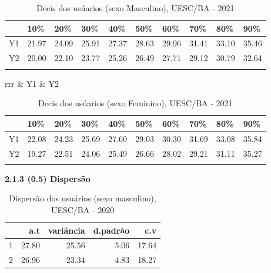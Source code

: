 \documentclass[12pt]{article}\usepackage[]{graphicx}\usepackage[]{color}
\begin{document}
\begin{table}[!ht]
  \centering
  \caption{Decis dos usúarios (sexo Masculino), UESC/BA - 2021}
\begin{tabular}{llllllllll}
\hline
   & 10\%  & 20\%  & 30\%  & 40\%  & 50\%  & 60\%  & 70\%  & 80\%  & 90\%  \\ \hline
Y1 & 21.97 & 24.09 & 25.91 & 27.37 & 28.63 & 29.96 & 31.41 & 33.10 & 35.46 \\
Y2 & 20.00 & 22.10 & 23.77 & 25.26 & 26.49 & 27.71 & 29.12 & 30.79 & 32.64 \\ \hline
   &       &       &       &       &       &       &       &       &      
\end{tabular}
 \end{table}

\begin{table}[!ht]
  \centering
  \caption{Decis dos usúarios (sexo Feminino), UESC/BA - 2021}
  \begin{tabular}{rrr}
  \toprule
 & Y1 & Y2 \\ 
  \midrule
\begin{tabular}{llllllllll}
\hline
   & 10\%  & 20\%  & 30\%  & 40\%  & 50\%  & 60\%  & 70\%  & 80\%  & 90\%  \\ \hline
Y1 & 22.08 & 24.23 & 25.69 & 27.60 & 29.03 & 30.30 & 31.69 & 33.08 & 35.84 \\
Y2 & 19.27 & 22.51 & 24.06 & 25.49 & 26.66 & 28.02 & 29.21 & 31.11 & 35.27 \\ \hline
   &       &       &       &       &       &       &       &       &      
\end{tabular}
   \bottomrule
\end{tabular} 
\end{table}

\textbf{2.1.3 (0.5) Dispersão}



\begin{table}[!ht]
  \centering
  \caption{Dispersão dos usuários (sexo masculino), UESC/BA - 2020}
 \begin{tabular}{rrrrr}
  \toprule
 & a.t & variância & d.padrão & c.v \\ 
  \midrule
1 & 27.80 & 25.56 & 5.06 & 17.64 \\ 
  2 & 26.96 & 23.34 & 4.83 & 18.27 \\ 
   \bottomrule
\end{tabular} 
\end{table}
       
\end{document}
